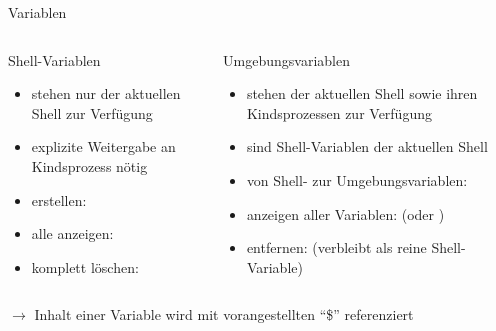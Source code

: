 \documentclass[aspectratio=43]{beamer}
\begin{document}
\begin{frame}{Variablen}
  \begin{columns}
    \begin{column}{0.435\textwidth}
      \begin{block}{Shell-Variablen}
        \begin{itemize}
          \item stehen nur der aktuellen Shell zur Verfügung
          \item explizite Weitergabe an Kindsprozess nötig
          \item erstellen: 
          \item alle anzeigen: 
          \item komplett löschen: 
        \end{itemize}
      \end{block}
    \end{column}
    \begin{column}{0.65\textwidth}
       \begin{block}{Umgebungsvariablen}
            \begin{itemize}
              \item stehen der aktuellen Shell sowie ihren Kindsprozessen zur Verfügung
              \item sind Shell-Variablen der aktuellen Shell
              \item von Shell- zur Umgebungsvariablen: 
              \item anzeigen aller Variablen:  (oder )
              \item entfernen:  (verbleibt als reine Shell-Variable)
            \end{itemize}
        \end{block}
    \end{column}
  \end{columns}
  $\rightarrow$ Inhalt einer Variable wird mit vorangestellten ``\$'' referenziert
\end{frame}
    
\end{document}
